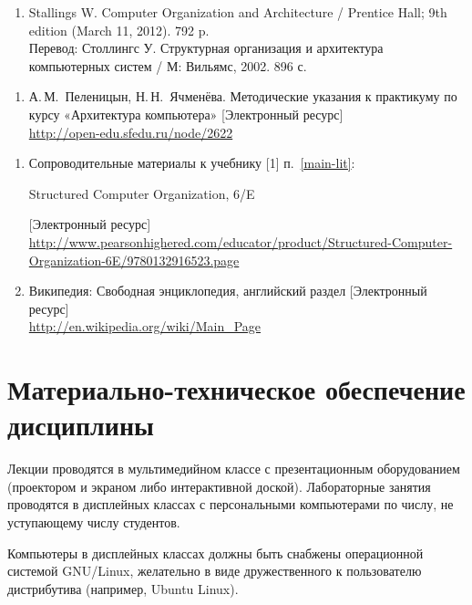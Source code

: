 \begin{enumerate}
	\item Stallings W. Computer Organization and Architecture /  Prentice Hall; 9th edition (March 11, 2012). 792 p.\\
	Перевод: Столлингс У. Структурная организация и архитектура компьютерных систем / М: Вильямс, 2002. 896 с.
\end{enumerate}

	\label{author-res}
\begin{enumerate}
	\item А.\,М.~Пеленицын, Н.\,Н.~Ячменёва. Методические указания к практикуму по курсу «Архитектура компьютера» [Электронный ресурс]\\
	\url{http://open-edu.sfedu.ru/node/2622}
\end{enumerate}

	\label{online-res}
\begin{enumerate}
	\item Сопроводительные материалы к учебнику [1] п.~\ref{main-lit}:
	\begin{otherlanguage}{english}
	Structured Computer Organization, 6/E
	\end{otherlanguage}
	[Электронный ресурс]\\
	\url{http://www.pearsonhighered.com/educator/product/Structured-Computer-Organization-6E/9780132916523.page}

	\item Википедия: Свободная энциклопедия, английский раздел [Электронный ресурс]\\
	\url{http://en.wikipedia.org/wiki/Main_Page}
\end{enumerate}

\section{Материально-техническое обеспечение дисциплины}

Лекции проводятся в мультимедийном классе с презентационным оборудованием (проектором и экраном либо интерактивной доской). Лабораторные занятия проводятся в дисплейных классах с персональными компьютерами по числу, не уступающему числу студентов.


Компьютеры в дисплейных классах должны быть снабжены операционной системой GNU/Linux, желательно в виде дружественного к пользователю дистрибутива (например, Ubuntu Linux).

